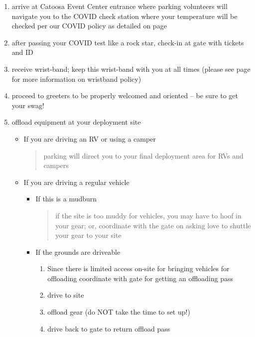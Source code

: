 \begin{enumerate}[noitemsep]
	\item arrive at Catoosa Event Center entrance where \gls{parking} volunteers will navigate you to the COVID check station where your temperature will be checked per our COVID policy as detailed on page \pageref{covid-policy}
    \item after passing your COVID test like a rock star, check-in at \gls{gate} with tickets and ID
    \item receive wrist-band; keep this wrist-band with you at all times (please see page \pageref{sub:wristbands} for more information on wristband policy)
    \item proceed to \glspl{greeter} to be properly welcomed and oriented -- be sure to get your swag!
 	\item offload equipment at your deployment site
      \begin{itemize}
          \item If you are driving an RV or using a camper
              \begin{quote}
                  \gls{parking} will direct you to your final deployment area for RVs and campers
              \end{quote}
          \item If you are driving a regular vehicle
              \begin{itemize}
          		\item If this is a \gls{mudburn}
              		\begin{quote}
              			if the site is too muddy for vehicles, you may have to hoof in your gear; or, coordinate with the \gls{gate} on asking \gls{love} to shuttle your gear to your site
              		\end{quote}
          		\item If the grounds are driveable
              		\begin{enumerate}
                       \item Since there is limited access on-site for bringing vehicles for offloading coordinate with \gls{gate} for getting an offloading pass 
                       \item drive to site
                       \item offload gear (do NOT take the time to set up!)
                       \item drive back to \gls{gate} to return offload pass
                    \end{enumerate}

\end{itemize}
\end{itemize}
\end{enumerate}
